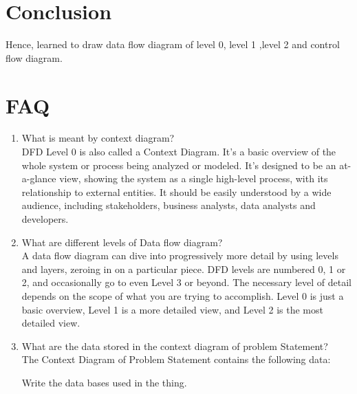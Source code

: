 \documentclass[11pt]{article}
\begin{document}
\section{Conclusion}
Hence, learned to draw data flow diagram of level 0, level 1 ,level 2 and control flow
diagram.

\section{FAQ}

\begin{enumerate}
	\item What is meant by context diagram?\\
	DFD Level 0 is also called a Context Diagram. It's a basic overview of the whole system or process being analyzed or modeled. It's designed to be an at-a-glance view, showing the system as a single high-level process, with its relationship to external entities. It should be easily understood by a wide audience, including stakeholders, business analysts, data analysts and developers. 

	\item What are different levels of Data flow diagram?\\
	
	A data flow diagram can dive into progressively more detail by using levels and layers, zeroing in on a particular piece.  DFD levels are numbered 0, 1 or 2, and occasionally go to even Level 3 or beyond. The necessary level of detail depends on the scope of what you are trying to accomplish. Level 0 is just a basic overview, Level 1 is a more detailed view, and Level 2 is the most detailed view.
	
	\item What are the data stored in the context diagram of problem Statement?\\
	The Context Diagram of Problem Statement contains the following data:

	Write the data bases used in the thing. 

\end{enumerate}
\end{document}

